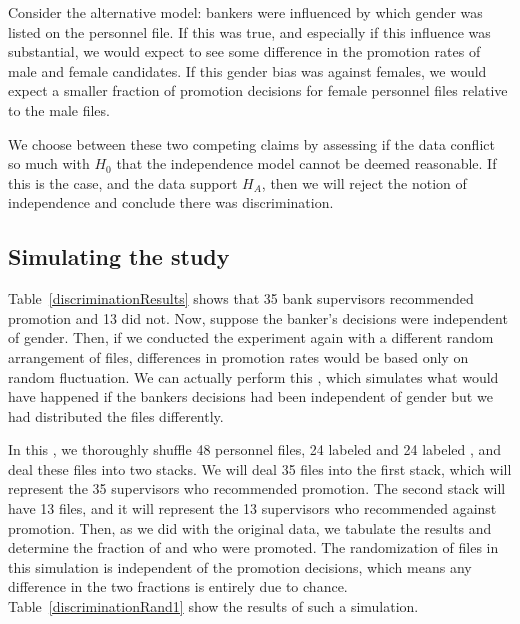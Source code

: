 Consider the alternative model: bankers were influenced by which gender was listed on the personnel file. If this was true, and especially if this influence was substantial, we would expect to see some difference in the promotion rates of male and female candidates. If this gender bias was against females, we would expect a smaller fraction of promotion decisions for female personnel files relative to the male files.

We choose between these two competing claims by assessing if the data conflict so much with $H_0$ that the independence model cannot be deemed reasonable. If this is the case, and the data support $H_A$, then we will reject the notion of independence and conclude there was discrimination.

\subsection{Simulating the study}
\label{simulatingTheStudy}

Table~\ref{discriminationResults} shows that 35 bank supervisors recommended promotion and 13 did not. Now, suppose the banker's decisions were independent of gender. Then, if we conducted the experiment again with a different random arrangement of files, differences in promotion rates would be based only on random fluctuation. We can actually perform this , which simulates what would have happened if the bankers decisions had been independent of gender but we had distributed the files differently.

In this , we thoroughly shuffle 48 personnel files, 24 labeled  and 24 labeled , and deal these files into two stacks. We will deal 35 files into the first stack, which will represent the 35 supervisors who recommended promotion. The second stack will have 13 files, and it will represent the 13 supervisors who recommended against promotion. Then, as we did with the original data, we tabulate the results and determine the fraction of  and  who were promoted. The randomization of files in this simulation is independent of the promotion decisions, which means any difference in the two fractions is entirely due to chance. Table~\ref{discriminationRand1} show the results of such a simulation.

